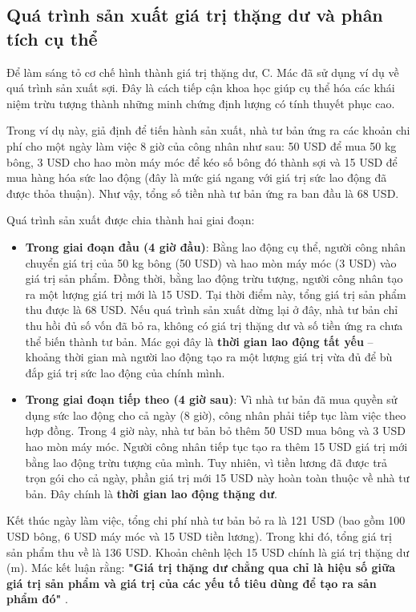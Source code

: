 \subsection{Quá trình sản xuất giá trị thặng dư và phân tích cụ thể}
Để làm sáng tỏ cơ chế hình thành giá trị thặng dư, C. Mác đã sử dụng ví dụ về quá trình sản xuất sợi. Đây là cách tiếp cận khoa học giúp cụ thể hóa các khái niệm trừu tượng thành những minh chứng định lượng có tính thuyết phục cao.

Trong ví dụ này, giả định để tiến hành sản xuất, nhà tư bản ứng ra các khoản chi phí cho một ngày làm việc 8 giờ của công nhân như sau: 50 USD để mua 50 kg bông, 3 USD cho hao mòn máy móc để kéo số bông đó thành sợi và 15 USD để mua hàng hóa sức lao động (đây là mức giá ngang với giá trị sức lao động đã được thỏa thuận). Như vậy, tổng số tiền nhà tư bản ứng ra ban đầu là 68 USD.

Quá trình sản xuất được chia thành hai giai đoạn:
\begin{itemize}
    \item \textbf{Trong giai đoạn đầu (4 giờ đầu)}: Bằng lao động cụ thể, người công nhân chuyển giá trị của 50 kg bông (50 USD) và hao mòn máy móc (3 USD) vào giá trị sản phẩm. Đồng thời, bằng lao động trừu tượng, người công nhân tạo ra một lượng giá trị mới là 15 USD. Tại thời điểm này, tổng giá trị sản phẩm thu được là 68 USD. Nếu quá trình sản xuất dừng lại ở đây, nhà tư bản chỉ thu hồi đủ số vốn đã bỏ ra, không có giá trị thặng dư và số tiền ứng ra chưa thể biến thành tư bản. Mác gọi đây là \textbf{thời gian lao động tất yếu} – khoảng thời gian mà người lao động tạo ra một lượng giá trị vừa đủ để bù đắp giá trị sức lao động của chính mình.
    \item \textbf{Trong giai đoạn tiếp theo (4 giờ sau)}: Vì nhà tư bản đã mua quyền sử dụng sức lao động cho cả ngày (8 giờ), công nhân phải tiếp tục làm việc theo hợp đồng. Trong 4 giờ này, nhà tư bản bỏ thêm 50 USD mua bông và 3 USD hao mòn máy móc. Người công nhân tiếp tục tạo ra thêm 15 USD giá trị mới bằng lao động trừu tượng của mình. Tuy nhiên, vì tiền lương đã được trả trọn gói cho cả ngày, phần giá trị mới 15 USD này hoàn toàn thuộc về nhà tư bản. Đây chính là \textbf{thời gian lao động thặng dư}.
\end{itemize}
Kết thúc ngày làm việc, tổng chi phí nhà tư bản bỏ ra là 121 USD (bao gồm 100 USD bông, 6 USD máy móc và 15 USD tiền lương). Trong khi đó, tổng giá trị sản phẩm thu về là 136 USD. Khoản chênh lệch 15 USD chính là giá trị thặng dư (m). Mác kết luận rằng: \textbf{"Giá trị thặng dư chẳng qua chỉ là hiệu số giữa giá trị sản phẩm và giá trị của các yếu tố tiêu dùng để tạo ra sản phẩm đó"} \cite[trang 312]{marx_engels_23}.

